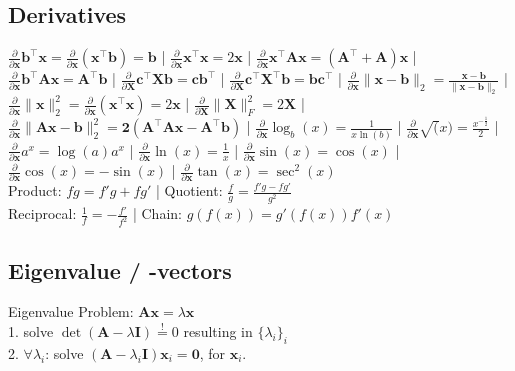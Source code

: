 \subsection*{Derivatives}
$\frac{\partial}{\partial \mathbf{x}}\mathbf{b}^\top \mathbf{x} = \frac{\partial}{\partial \mathbf{x}}(\mathbf{x}^\top \mathbf{b}) = \mathbf{b}$ |
$\frac{\partial}{\partial \mathbf{x}}\mathbf{x}^\top \mathbf{x} = 2\mathbf{x}$ |
$\frac{\partial}{\partial \mathbf{x}}\mathbf{x}^\top \mathbf{A}\mathbf{x} = (\mathbf{A}^\top + \mathbf{A})\mathbf{x}$ |
$\frac{\partial}{\partial \mathbf{x}}\mathbf{b}^\top \mathbf{A}\mathbf{x} = \mathbf{A}^\top \mathbf{b}$ |
$\frac{\partial}{\partial \mathbf{X}}\mathbf{c}^\top \mathbf{X} \mathbf{b} = \mathbf{c}\mathbf{b}^\top$ |
$\frac{\partial}{\partial \mathbf{X}}\mathbf{c}^\top \mathbf{X}^\top \mathbf{b} = \mathbf{b}\mathbf{c}^\top$ |
$\frac{\partial}{\partial \mathbf{x}}\| \mathbf{x}-\mathbf{b} \|_2 = \frac{\mathbf{x}-\mathbf{b}}{\|\mathbf{x}-\mathbf{b}\|_2}$ |
$\frac{\partial}{\partial \mathbf{x}}\|\mathbf{x}\|^2_2 = \frac{\partial}{\partial \mathbf{x}} (\mathbf{x}^\top \mathbf{x}) = 2\mathbf{x}$ |
$\frac{\partial}{\partial \mathbf{X}}\|\mathbf{X}\|_F^2 = 2\mathbf{X}$ |
$\frac{\partial}{\partial \mathbf{x}}\|\mathbf{Ax - b}\|_2^2 = \mathbf{2(A^\top Ax-A^\top b)}$ |
$\frac{\partial}{\partial \mathbf{x}}\log_b(x) = \frac{1}{x \ln(b)}$ |
$\frac{\partial}{\partial \mathbf{x}}\sqrt(x) = \frac{x^{-\frac{1}{2}}}{2}$ |
$\frac{\partial}{\partial \mathbf{x}}a^x = \log(a) a^x$ |
$\frac{\partial}{\partial \mathbf{x}}\ln(x) = \frac{1}{x}$ |
$\frac{\partial}{\partial \mathbf{x}}\sin(x) = \cos(x)$ |
$\frac{\partial}{\partial \mathbf{x}}\cos(x) = -\sin(x)$ |
$\frac{\partial}{\partial \mathbf{x}}\tan(x) = \sec^2(x)$\\
Product: $f g = f'g + fg'$ |
Quotient: $\frac{f}{g} = \frac{f'g - fg'}{g^2}$ \\
Reciprocal: $\frac{1}{f} = -\frac{f'}{f^2}$ |
Chain: $g(f(x)) = g'(f(x))f'(x)$

\subsection*{Eigenvalue / -vectors}
Eigenvalue Problem: $\mathbf{Ax} = \lambda \mathbf{x}$\\
1. solve $\operatorname{det}(\mathbf{A} - \lambda \mathbf{I}) \overset{!}{=} 0$ resulting in $\{\lambda_i\}_i$\\
2. $\forall \lambda_i$:
solve $(\mathbf{A} - \lambda_i \mathbf{I}) \mathbf{x}_i = \mathbf{0}$, for $\mathbf{x}_i$.

